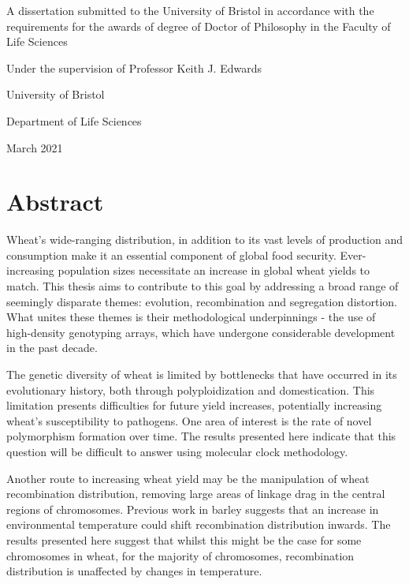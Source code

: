 \begin{center}
A dissertation submitted to the University of Bristol in accordance with the requirements for the awards of degree of Doctor of Philosophy in the Faculty of Life Sciences 

\bigskip
\bigskip
\bigskip
\bigskip
\bigskip
\bigskip
\bigskip


Under the supervision of Professor Keith J. Edwards 


\bigskip


University of Bristol

Department of Life Sciences 

March 2021
\end{center}



\vfill
\hspace{0pt}

\setcounter{secnumdepth}{-8}
\cleardoublepage%

\newpage

\section{Abstract}

Wheat's wide-ranging distribution, in addition to its vast levels of production and consumption make it an essential
component of global food security. Ever-increasing population sizes necessitate an increase in global wheat yields to
match. This thesis aims to contribute to this goal by addressing a broad range of seemingly disparate themes: evolution,
recombination and segregation distortion. What unites these themes is their methodological underpinnings - the use of
high-density genotyping arrays, which have undergone considerable development in the past decade.

The genetic diversity of wheat is limited by bottlenecks that have occurred in its evolutionary history, both through
polyploidization and domestication. This limitation presents difficulties for future yield increases, potentially
increasing wheat's susceptibility to pathogens. One area of interest is the rate of novel polymorphism formation over
time. The results presented here indicate that this question will be difficult to answer using molecular clock
methodology.

Another route to increasing wheat yield may be the manipulation of wheat recombination distribution, removing large
areas of linkage drag in the central regions of chromosomes. Previous work in barley suggests that an increase in
environmental temperature could shift recombination distribution inwards. The results presented here suggest that whilst
this might be the case for some chromosomes in wheat, for the majority of chromosomes, recombination distribution is
unaffected by changes in temperature.

